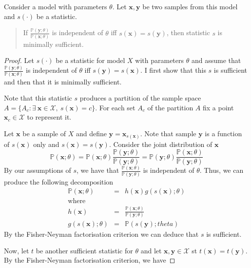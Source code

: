 \documentclass[11pt,a4paper]{article}
\newcommand*{\prob}{\mathbb{P}}
\theoremstyle{break}
\begin{document}
  \begin{box_theorem}\label{the_condition_for_minimal_sufficiency}
    Consider a model with parameters $\theta$. Let $\mathbf{x},\mathbf{y}$ be two samples from this model and $s(\cdot)$ be a statistic.
    \begin{quote}
      If $\frac{\prob(\mathbf{y};\theta)}{\prob(\mathbf{x};\theta)}$ is independent of $\theta$ iff $s(\mathbf{x})=s(\mathbf{y})$, then statistic $s$ is minimally sufficient.
    \end{quote}
    \begin{proof}
      Let $s(\cdot)$ be a statistic for model $X$ with parameters $\theta$ and assume that $\frac{\prob(\mathbf{y};\theta)}{\prob(\mathbf{x};\theta)}$ is independent of $\theta$ iff $s(\mathbf{y})=s(\mathbf{x})$. I first show that this $s$ is sufficient and then that it is minimally sufficient.
      \par Note that this statistic $s$ produces a partition of the sample space $A=\{A_c:\exists\ \mathbf{x}\in\mathcal{X},\ s(\mathbf{x})=c\}$. For each set $A_c$ of the partition $A$ fix a point $\mathbf{x}_c\in\mathcal{X}$ to represent it.
      \par Let $\mathbf{x}$ be a sample of $X$ and define $\mathbf{y}=\mathbf{x}_{s(\mathbf{x})}$. Note that sample $\mathbf{y}$ is a function of $s(\mathbf{x})$ only and $s(\mathbf{x})=s(\mathbf{y})$. Consider the joint distribution of $\mathbf{x}$
      \[\prob(\mathbf{x};\theta)=\prob(\mathbf{x};\theta)\frac{\prob(\mathbf{y};\theta)}{\prob(\mathbf{y};\theta)}=\prob(\mathbf{y};\theta)\frac{\prob(\mathbf{x};\theta)}{\prob(\mathbf{y};\theta)} \]
      By our assumptions of $s$, we have that $\frac{\prob(\mathbf{x};\theta)}{\prob(\mathbf{y};\theta)}$ is independent of $\theta$. Thus, we can produce the following decomposition
      \[\begin{array}{rcl}
        \prob(\mathbf{x};\theta)&=&h(\mathbf{x})g(s(\mathbf{x});\theta)\\
        \text{where}&\\
        h(\mathbf{x})&=&\frac{\prob(\mathbf{x};\theta)}{\prob(\mathbf{y};\theta)}\\
        g(s(\mathbf{x});\theta)&=&\prob(s(\mathbf{y});theta)
      \end{array}\]
      By the Fisher-Neyman factorisation criterion we can deduce that $s$ is sufficient.
      \par Now, let $t$ be another sufficient statistic for $\theta$ and let $\mathbf{x},\mathbf{y}\in\mathcal{X}$ st $t(\mathbf{x})=t(\mathbf{y})$. By the Fisher-Neyman factorisation criterion, we have

\end{proof}
\end{box_theorem}
\end{document}
